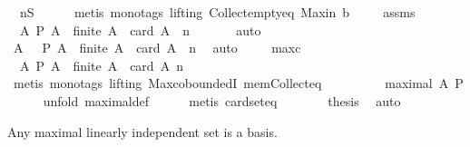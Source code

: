\begin{isabellebody}
\ {}{\isacharcolon}\ {\isachardoublequoteopen}{\isacharquery}n{\isasymin}{\isacharquery}S{\isachardoublequoteclose}\isanewline
\ \ \ \ \isamarkupfalse%
\ {\isacharparenleft}metis\ {\isacharparenleft}mono{\isacharunderscore}tags{\isacharcomma}\ lifting{\isacharparenright}\ Collect{\isacharunderscore}empty{\isacharunderscore}eq\ Max{\isacharunderscore}in\ b{\isacharparenright}\ \isanewline
\ \ \isamarkupfalse%
\ assms\ {}\ \isamarkupfalse%
\ {}{\isacharcolon}\ {\isachardoublequoteopen}{\isasymexists}A{\isachardot}\ P\ A\ {\isasymand}\ finite\ A\ {\isasymand}\ card\ A\ {\isacharequal}\ {\isacharquery}n{\isachardoublequoteclose}\ \isanewline
\ \ \ \ \isamarkupfalse%
\ auto\isanewline
\ \ \isamarkupfalse%
\ {}\ \isamarkupfalse%
\ A\ \ {}{\isacharcolon}\ {\isachardoublequoteopen}P\ A\ {\isasymand}\ finite\ A\ {\isasymand}\ card\ A\ {\isacharequal}\ {\isacharquery}n{\isachardoublequoteclose}\ \isamarkupfalse%
\ auto\isanewline
\ \ \isamarkupfalse%
\ {}\ maxc\ \isamarkupfalse%
\ {}{\isacharcolon}\ {\isachardoublequoteopen}{\isasymAnd}A{\isachardot}\ P\ A\ {\isasymLongrightarrow}\ finite\ A\ {\isasymand}\ {\isacharparenleft}card\ A\ {\isasymle}{\isacharquery}n{\isacharparenright}{\isachardoublequoteclose}\isanewline
\ \ \ \ \isamarkupfalse%
\ {\isacharparenleft}metis\ {\isacharparenleft}mono{\isacharunderscore}tags{\isacharcomma}\ lifting{\isacharparenright}\ Max{\isachardot}coboundedI\ mem{\isacharunderscore}Collect{\isacharunderscore}eq{\isacharparenright}\ \isanewline
\ \ \isamarkupfalse%
\ {}\ {}\ \isamarkupfalse%
\ {}{\isacharcolon}\ {\isachardoublequoteopen}maximal\ A\ P{\isachardoublequoteclose}\isanewline
\ \ \ \ \isamarkupfalse%
\ {\isacharparenleft}unfold\ maximal{\isacharunderscore}def{\isacharparenright}\isanewline
\ \ \ \ \isamarkupfalse%
\ {\isacharparenleft}metis\ card{\isacharunderscore}seteq{\isacharparenright}\isanewline
\ \ \isamarkupfalse%
\ {}\ {}\ \isamarkupfalse%
\ {\isacharquery}thesis\ \isamarkupfalse%
\ auto\isanewline
{}\isamarkupfalse%
%
\endisatagproof
{\isafoldproof}%
%
\isadelimproof
%
\endisadelimproof
%
\begin{isamarkuptext}%
Any maximal linearly independent set is a basis.%

\end{isamarkuptext}
\end{isabellebody}
